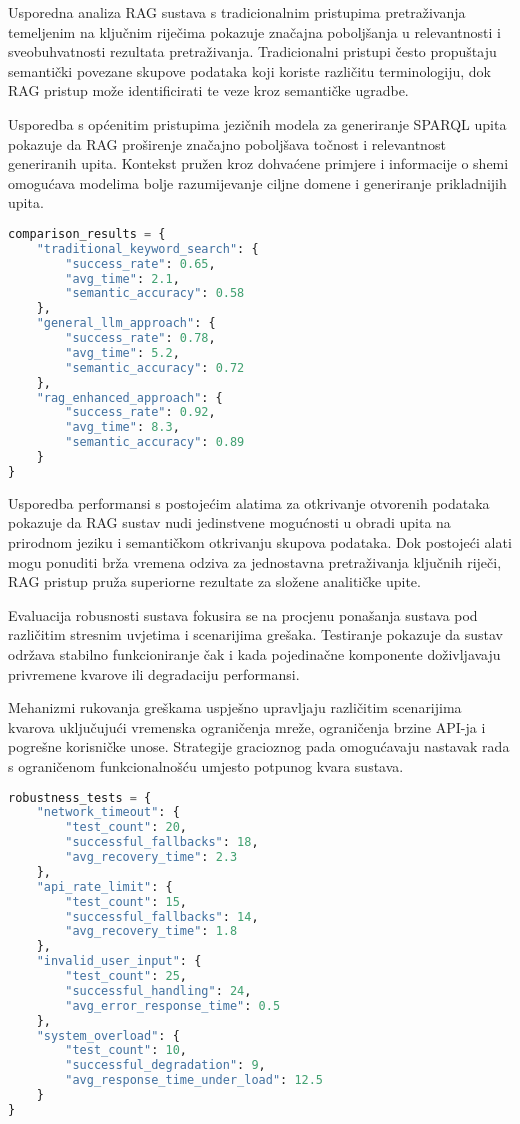 Usporedna analiza RAG sustava s tradicionalnim pristupima pretraživanja temeljenim na ključnim riječima pokazuje značajna poboljšanja u relevantnosti i sveobuhvatnosti rezultata pretraživanja. Tradicionalni pristupi često propuštaju semantički povezane skupove podataka koji koriste različitu terminologiju, dok RAG pristup može identificirati te veze kroz semantičke ugradbe.

Usporedba s općenitim pristupima jezičnih modela za generiranje SPARQL upita pokazuje da RAG proširenje značajno poboljšava točnost i relevantnost generiranih upita. Kontekst pružen kroz dohvaćene primjere i informacije o shemi omogućava modelima bolje razumijevanje ciljne domene i generiranje prikladnijih upita.

\begin{lstlisting}[language=Python, caption=Usporedba različitih pristupa]
comparison_results = {
    "traditional_keyword_search": {
        "success_rate": 0.65,
        "avg_time": 2.1,
        "semantic_accuracy": 0.58
    },
    "general_llm_approach": {
        "success_rate": 0.78,
        "avg_time": 5.2,
        "semantic_accuracy": 0.72
    },
    "rag_enhanced_approach": {
        "success_rate": 0.92,
        "avg_time": 8.3,
        "semantic_accuracy": 0.89
    }
}
\end{lstlisting}

Usporedba performansi s postojećim alatima za otkrivanje otvorenih podataka pokazuje da RAG sustav nudi jedinstvene mogućnosti u obradi upita na prirodnom jeziku i semantičkom otkrivanju skupova podataka. Dok postojeći alati mogu ponuditi brža vremena odziva za jednostavna pretraživanja ključnih riječi, RAG pristup pruža superiorne rezultate za složene analitičke upite.

Evaluacija robusnosti sustava fokusira se na procjenu ponašanja sustava pod različitim stresnim uvjetima i scenarijima grešaka. Testiranje pokazuje da sustav održava stabilno funkcioniranje čak i kada pojedinačne komponente doživljavaju privremene kvarove ili degradaciju performansi.

Mehanizmi rukovanja greškama uspješno upravljaju različitim scenarijima kvarova uključujući vremenska ograničenja mreže, ograničenja brzine API-ja i pogrešne korisničke unose. Strategije gracioznog pada omogućavaju nastavak rada s ograničenom funkcionalnošću umjesto potpunog kvara sustava.

\begin{lstlisting}[language=Python, caption=Testiranje robusnosti]
robustness_tests = {
    "network_timeout": {
        "test_count": 20,
        "successful_fallbacks": 18,
        "avg_recovery_time": 2.3
    },
    "api_rate_limit": {
        "test_count": 15,
        "successful_fallbacks": 14,
        "avg_recovery_time": 1.8
    },
    "invalid_user_input": {
        "test_count": 25,
        "successful_handling": 24,
        "avg_error_response_time": 0.5
    },
    "system_overload": {
        "test_count": 10,
        "successful_degradation": 9,
        "avg_response_time_under_load": 12.5
    }
}
\end{lstlisting}

